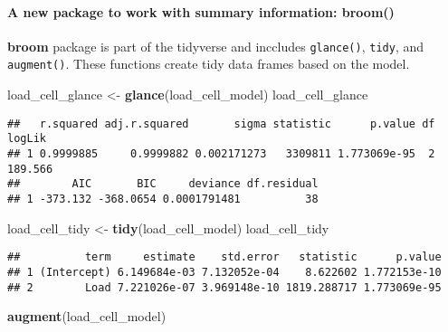 \documentclass[]{book}
\newenvironment{Shaded}{\begin{snugshade}}{\end{snugshade}}
\newcommand{\KeywordTok}[1]{\textcolor[rgb]{0.13,0.29,0.53}{\textbf{#1}}}
\newcommand{\NormalTok}[1]{#1}
\newcommand{\StringTok}[1]{\textcolor[rgb]{0.31,0.60,0.02}{#1}}
\let\oldparagraph\paragraph
\renewcommand{\paragraph}[1]{\oldparagraph{#1}\mbox{}}
\theoremstyle{definition}
\theoremstyle{definition}
\theoremstyle{definition}
\theoremstyle{remark}
\begin{document}
\hypertarget{a-new-package-to-work-with-summary-information-broom}{%
\paragraph{A new package to work with summary information:
broom()}\label{a-new-package-to-work-with-summary-information-broom}}

\textbf{broom} package is part of the tidyverse and inccludes
\texttt{glance()}, \texttt{tidy}, and \texttt{augment()}. These
functions create tidy data frames based on the model.

\begin{Shaded}
\begin{Highlighting}[]
\NormalTok{load_cell_glance <-}\StringTok{ }\KeywordTok{glance}\NormalTok{(load_cell_model)}
\NormalTok{load_cell_glance}
\end{Highlighting}
\end{Shaded}

\begin{verbatim}
##   r.squared adj.r.squared       sigma statistic      p.value df  logLik
## 1 0.9999885     0.9999882 0.002171273   3309811 1.773069e-95  2 189.566
##        AIC       BIC     deviance df.residual
## 1 -373.132 -368.0654 0.0001791481          38
\end{verbatim}

\begin{Shaded}
\begin{Highlighting}[]
\NormalTok{load_cell_tidy <-}\StringTok{ }\KeywordTok{tidy}\NormalTok{(load_cell_model)}
\NormalTok{load_cell_tidy}
\end{Highlighting}
\end{Shaded}

\begin{verbatim}
##          term     estimate    std.error   statistic      p.value
## 1 (Intercept) 6.149684e-03 7.132052e-04    8.622602 1.772153e-10
## 2        Load 7.221026e-07 3.969148e-10 1819.288717 1.773069e-95
\end{verbatim}

\begin{Shaded}
\begin{Highlighting}[]
\KeywordTok{augment}\NormalTok{(load_cell_model)}
\end{Highlighting}
\end{Shaded}
\end{document}

